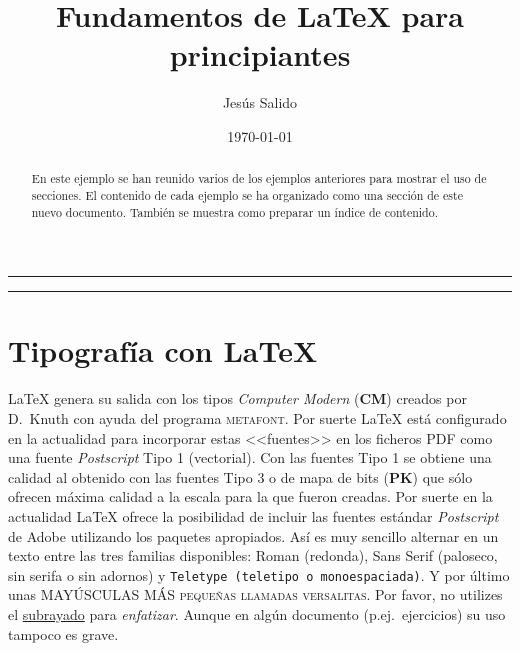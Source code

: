 \documentclass[11pt,a4paper]{article}
\author{Jesús Salido}
\title{Fundamentos de \LaTeX{} para principiantes}
\date{\today}
\begin{document}
\maketitle 

\begin{abstract}
	En este ejemplo se han reunido varios de los ejemplos anteriores para mostrar el uso de secciones. El contenido de cada ejemplo se ha organizado como una sección de este nuevo documento. También se muestra como preparar un índice de contenido.
\end{abstract}




\hrule %
\tableofcontents %
\vspace{0.5cm} %
\hrule

\section{Tipografía con \LaTeX{}}
\label{sec:tipos} %

\LaTeX{} genera su salida con los tipos \emph{Computer Modern} (\textbf{CM}) creados por D.~Knuth con ayuda del programa \textsc{metafont}. Por suerte \LaTeX{} está configurado en la actualidad para incorporar estas <<fuentes>> en los ficheros PDF como una fuente \emph{Postscript} Tipo 1 (vectorial). Con las fuentes Tipo 1 se obtiene una calidad al obtenido con las fuentes Tipo 3 o de mapa de bits (\textbf{PK}) que sólo ofrecen máxima calidad a la escala para la que fueron creadas. Por suerte en la actualidad \LaTeX{} ofrece la posibilidad de incluir las fuentes estándar \emph{Postscript} de \textsf{Adobe} utilizando los paquetes apropiados. Así es muy sencillo alternar en un texto entre las tres familias disponibles: Roman (redonda), \textsf{Sans Serif (paloseco, sin serifa o sin adornos)} y \texttt{Teletype (teletipo o monoespaciada)}. Y por último unas MAYÚSCULAS MÁS \textsc{pequeñas llamadas versalitas}. Por favor, no utilizes el \underline{subrayado} para \emph{enfatizar}. Aunque en algún documento (p.ej.\ ejercicios) su uso tampoco es grave.
\end{document}
